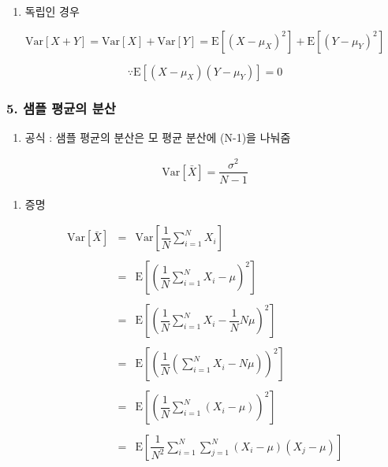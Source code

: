 \documentclass[11pt]{article}
\providecommand{\tightlist}{%
      \setlength{\itemsep}{0pt}\setlength{\parskip}{0pt}}
\begin{document}
    \begin{enumerate}
\def\labelenumi{\arabic{enumi})}
\setcounter{enumi}{1}
\tightlist
\item
  독립인 경우
\end{enumerate}

    \[\text{Var}\left[ X + Y \right] = \text{Var}\left[ X \right] + \text{Var}\left[ Y \right] = \text{E}\left[ (X -\mu_X)^2 \right] + \text{E}\left[ (Y - \mu_Y)^2 \right]\]

    \[ \because \text{E}\left[ (X-\mu_X)(Y-\mu_Y) \right] = 0\]

    \hypertarget{uxc0d8uxd50c-uxd3c9uxade0uxc758-uxbd84uxc0b0}{%
\subsubsection{5. 샘플 평균의
분산}\label{uxc0d8uxd50c-uxd3c9uxade0uxc758-uxbd84uxc0b0}}

    \begin{enumerate}
\def\labelenumi{\arabic{enumi})}
\tightlist
\item
  공식 : 샘플 평균의 분산은 모 평균 분산에 (N-1)을 나눠줌
\end{enumerate}

    \[ 
\begin{eqnarray}
\text{Var}[\bar{X}] = \dfrac{\sigma^2}{N-1}\end{eqnarray}
\]

    \begin{enumerate}
\def\labelenumi{\arabic{enumi})}
\setcounter{enumi}{1}
\tightlist
\item
  증명
\end{enumerate}

    \[ 
\begin{eqnarray}
\text{Var}[\bar{X}] 
&=& \text{Var} \left[ \dfrac{1}{N} \sum_{i=1}^N X_i \right] \\\\
&=& \text{E} \left[ \left( \dfrac{1}{N} \sum_{i=1}^N X_i - \mu \right)^2 \right] \\\\
&=& \text{E} \left[ \left( \dfrac{1}{N} \sum_{i=1}^N X_i - \dfrac{1}{N}N\mu \right)^2 \right] \\\\
&=& \text{E} \left[ \left( \dfrac{1}{N} \left( \sum_{i=1}^N X_i - N\mu \right) \right)^2 \right] \\\\
&=& \text{E} \left[ \left( \dfrac{1}{N} \sum_{i=1}^N (X_i - \mu) \right)^2 \right] \\\\
&=& \text{E} \left[ \dfrac{1}{N^2} \sum_{i=1}^N \sum_{j=1}^N (X_i - \mu) (X_j - \mu)  \right] \\\\\end{eqnarray}\]
\end{document}
